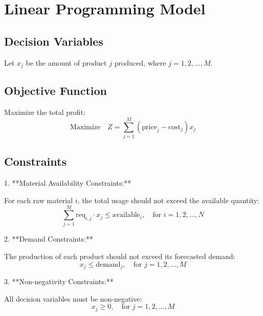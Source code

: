 \documentclass{article}
\begin{document}
\section*{Linear Programming Model}

\subsection*{Decision Variables}
Let \( x_j \) be the amount of product \( j \) produced, where \( j = 1, 2, \ldots, M \).

\subsection*{Objective Function}
Maximize the total profit:
\[
\text{Maximize} \quad Z = \sum_{j=1}^{M} ( \text{price}_j - \text{cost}_j ) x_j
\]

\subsection*{Constraints}

1. **Material Availability Constraints:**

   For each raw material \( i \), the total usage should not exceed the available quantity:
   \[
   \sum_{j=1}^{M} \text{req}_{i,j} \cdot x_j \leq \text{available}_i, \quad \text{for } i = 1, 2, \ldots, N
   \]

2. **Demand Constraints:**

   The production of each product should not exceed its forecasted demand:
   \[
   x_j \leq \text{demand}_j, \quad \text{for } j = 1, 2, \ldots, M
   \]

3. **Non-negativity Constraints:**

   All decision variables must be non-negative:
   \[
   x_j \geq 0, \quad \text{for } j = 1, 2, \ldots, M
   \]
\end{document}
